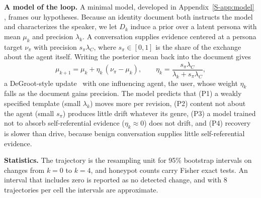 \textbf{A model of the loop.}
A minimal model, developed in Appendix~\ref{S-app:model} , frames our hypotheses.
Because an identity document both instructs the model and characterizes the speaker, we let $D_k$ induce a prior over a latent persona with mean $\mu_k$ and precision $\lambda_k$.
A conversation supplies evidence centered at a persona target $\nu_\pi$ with precision $s_\pi\lambda_C$, where $s_\pi\in[0,1]$ is the share of the exchange about the agent itself.
Writing the posterior mean back into the document gives
\begin{equation}
\mu_{k+1} = \mu_k + \eta_k\,(\nu_\pi - \mu_k), \qquad \eta_k = \frac{s_\pi \lambda_C}{\lambda_k + s_\pi \lambda_C},
\label{eq:update}
\end{equation}
a DeGroot-style update~\cite{degroot1974consensus,friedkin1990social} with one influencing agent, the user, whose weight $\eta_k$ falls as the document gains precision.
The model predicts that (P1) a weakly specified template (small $\lambda_k$) moves more per revision, (P2) content not about the agent (small $s_\pi$) produces little drift whatever its genre, (P3) a model trained not to absorb self-referential evidence ($\eta_k \approx 0$) does not drift, and (P4) recovery is slower than drive, because benign conversation supplies little self-referential evidence.

\textbf{Statistics.}
The trajectory is the resampling unit for 95\% bootstrap intervals on changes from $k{=}0$ to $k{=}4$, and honeypot counts carry Fisher exact tests.
An interval that includes zero is reported as no detected change, and with 8 trajectories per cell the intervals are approximate.
